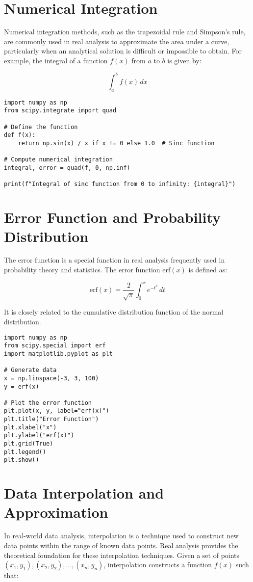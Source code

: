 \documentclass{article}
\begin{document}
\section{Numerical Integration}
Numerical integration methods, such as the trapezoidal rule and Simpson's rule, are commonly used in real analysis to approximate the area under a curve, particularly when an analytical solution is difficult or impossible to obtain. For example, the integral of a function \( f(x) \) from \( a \) to \( b \) is given by:

\[
\int_a^b f(x) \, dx
\]

\begin{lstlisting}[caption={Numerical Integration of a Function in Python}, label=code:integration]
import numpy as np
from scipy.integrate import quad

# Define the function
def f(x):
    return np.sin(x) / x if x != 0 else 1.0  # Sinc function

# Compute numerical integration
integral, error = quad(f, 0, np.inf)

print(f"Integral of sinc function from 0 to infinity: {integral}")
\end{lstlisting}

\section{Error Function and Probability Distribution}
The error function is a special function in real analysis frequently used in probability theory and statistics. The error function \( \text{erf}(x) \) is defined as:

\[
\text{erf}(x) = \frac{2}{\sqrt{\pi}} \int_0^x e^{-t^2} \, dt
\]

It is closely related to the cumulative distribution function of the normal distribution.

\begin{lstlisting}[caption={Plotting the Error Function in Python}, label=code:erf]
import numpy as np
from scipy.special import erf
import matplotlib.pyplot as plt

# Generate data
x = np.linspace(-3, 3, 100)
y = erf(x)

# Plot the error function
plt.plot(x, y, label="erf(x)")
plt.title("Error Function")
plt.xlabel("x")
plt.ylabel("erf(x)")
plt.grid(True)
plt.legend()
plt.show()
\end{lstlisting}

\section{Data Interpolation and Approximation}
In real-world data analysis, interpolation is a technique used to construct new data points within the range of known data points. Real analysis provides the theoretical foundation for these interpolation techniques. Given a set of points \( (x_1, y_1), (x_2, y_2), \dots, (x_n, y_n) \), interpolation constructs a function \( f(x) \) such that:
\end{document}
